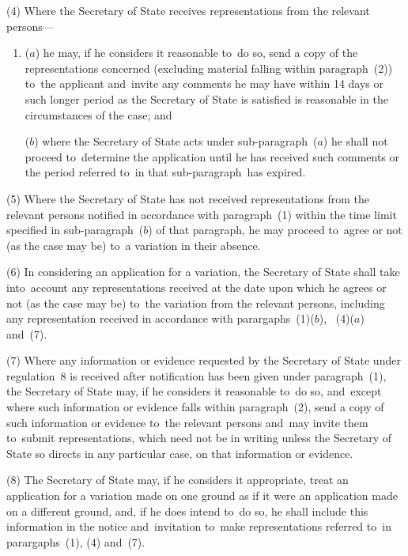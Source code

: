 \documentclass[12pt,a4paper]{article}
\begin{document}
(4) Where the Secretary of State receives representations from the relevant persons—
\begin{enumerate}\item[]
($a$) he may, if he considers it reasonable to~do so, send a copy of the representations concerned (excluding material falling within paragraph~(2)) to~the applicant and~invite any comments he may have within 14 days or such longer period as the Secretary of State is satisfied is reasonable in the circumstances of the case; and

($b$) where the Secretary of State acts under sub-paragraph~($a$)  he shall not proceed to~determine the application until he has received such comments or the period referred to~in that sub-paragraph~has expired.
\end{enumerate}

(5) Where the Secretary of State has not received representations from the relevant persons notified in accordance with paragraph~(1) within the time limit specified in sub-paragraph~($b$)  of that paragraph, he may proceed to~agree or not (as the case may be) to~a variation in their absence.

(6) In considering an application for a variation, the Secretary of State shall take into~account any representations received at the date upon which he agrees or not (as the case may be) to~the variation from the relevant persons, including any representation received in accordance with parargaphs~(1)($b$),~%
(4)($a$)  %
and~(7).

(7) Where any information or evidence requested by the Secretary of State under regulation~8 is received after notification has been given under paragraph~(1), the Secretary of State may, if he considers it reasonable to~do so, and~except where such information or evidence falls within paragraph~(2), send a copy of such information or evidence to~the relevant persons and~may invite them to~submit representations, which need not be in writing unless the Secretary of State so directs in any particular case, on that information or evidence.

(8) The Secretary of State may, if he considers it appropriate, treat an application for a variation made on one ground as if it were an application made on a different ground, and, if he does intend to~do so, he shall include this information in the notice and~invitation to~make representations referred to~in parargaphs~(1), (4) and~(7).
\end{document}
